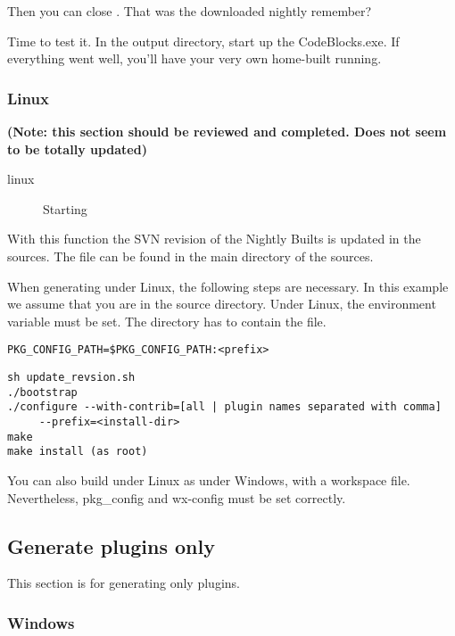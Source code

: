 Then you can close \codeblocks. That was the downloaded nightly remember?

Time to test it. In the output directory, start up the CodeBlocks.exe. If everything went well, you'll have your very own home-built \codeblocks running.

\subsubsection{Linux}

\textbf{(Note: this section should be reviewed and completed. Does not seem to be totally updated)}

\begin{description}
\item[linux] Starting 
\end{description}

With this function the SVN revision of the Nightly Builts is updated in the sources. The file can be found in the main directory of the \codeblocks sources.

When generating under Linux, the following steps are necessary. In this example we assume that you are in the \codeblocks source directory.  Under Linux, the environment variable  must be set. The  directory has to contain the  file.

\begin{verbatim}
PKG_CONFIG_PATH=$PKG_CONFIG_PATH:<prefix>
\end{verbatim}


\begin{verbatim}
sh update_revsion.sh
./bootstrap
./configure --with-contrib=[all | plugin names separated with comma]
     --prefix=<install-dir>
make
make install (as root)
\end{verbatim}

You can also build under Linux as under Windows, with a workspace file. Nevertheless, pkg\_config and wx-config must be set correctly.

\subsection{Generate plugins only}

This section is for generating only plugins.

\subsubsection{Windows}

